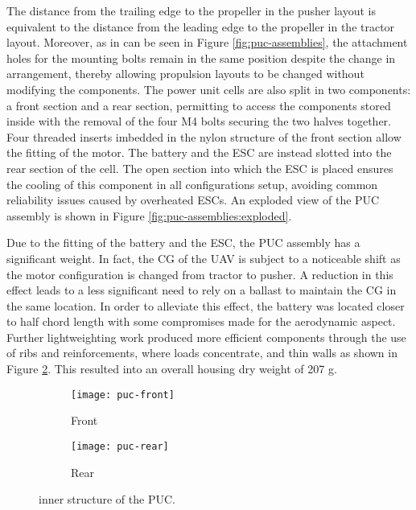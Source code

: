 \documentclass[../../main.tex]{subfiles}
\begin{document}
The distance from the trailing edge to the propeller in the pusher layout is equivalent to the distance from the leading edge to the propeller in the tractor layout.
Moreover, as in can be seen in Figure \ref{fig:puc-assemblies}, the attachment holes for the mounting bolts remain in the same position despite the change in arrangement, thereby allowing propulsion layouts to be changed without modifying the components. 
The power unit cells are also split in two components: a front section and a rear section, permitting to access the components stored inside with the removal of the four M4 bolts securing the two halves together.
Four threaded inserts imbedded in the nylon structure of the front section allow the fitting of the motor.
The battery and the ESC are instead slotted into the rear section of the cell.
The open section into which the ESC is placed ensures the cooling of this component in all configurations setup, avoiding common reliability issues caused by overheated ESCs.
An exploded view of the PUC assembly is shown in Figure \ref{fig:puc-assemblies:exploded}. 


Due to the fitting of the battery and the ESC, the PUC assembly has a significant weight.
In fact, the CG of the UAV is subject to a noticeable shift as the motor configuration is changed from tractor to pusher.
A reduction in this effect leads to a less significant need to rely on a ballast to maintain the CG in the same location. 
In order to alleviate this effect, the battery was located closer to half chord length with some compromises made for the aerodynamic aspect.
Further lightweighting work produced more efficient components through the use of ribs and reinforcements, where loads concentrate, and thin walls as shown in Figure \ref{fig:puc-design:rear}.
This resulted into an overall housing dry weight of 207 g. 


\begin{figure}[H]
    \centering
    \begin{subfigure}[b]{0.4\columnwidth}
        \centering
        \texttt{[image: puc-front]}
        \caption{Front}
        \label{fig:puc-design:front}
    \end{subfigure}
    \hfill
    \begin{subfigure}[b]{0.4\columnwidth}
        \centering
        \texttt{[image: puc-rear]}
        \caption{Rear}
        \label{fig:puc-design:rear}
    \end{subfigure}
    
    \caption{inner structure of the PUC.}
    \label{fig:puc-design}
\end{figure} 

\end{document}
